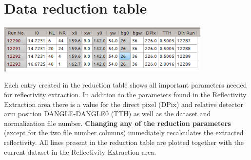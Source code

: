 \section{Data reduction table}
  \includegraphics[width=0.8\textwidth]{screenshots/reductiontable.png}

  Each entry created in the reduction table shows all important parameters needed for reflectivity extraction.
  In addition to the parameters found in the Reflectivity Extraction area there is a value for the direct pixel (DPix) and relative detector arm position DANGLE-DANGLE0 (TTH) as well as the dataset and normalization file number.
  \textbf{Changing any of the reduction parameters} (except for the two file number columns) immediately recalculates the extracted reflectivity.
  All lines present in the reduction table are plotted together with the current dataset in the Reflectivity Extraction area.

